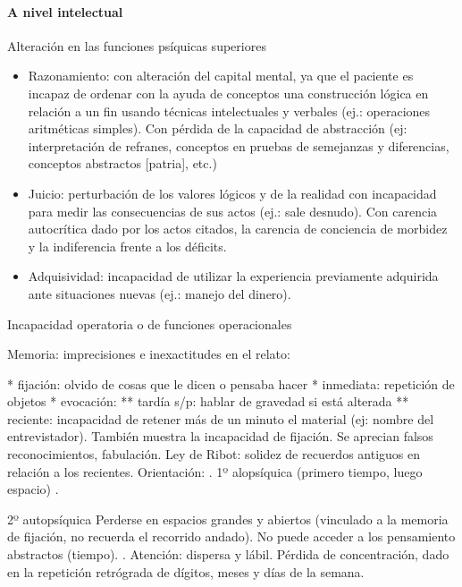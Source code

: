 \documentclass{scrbook}
\begin{document}
\paragraph{A nivel intelectual}
Alteración en las funciones psíquicas superiores
\begin{itemize}
	\item Razonamiento: con alteración del capital mental, ya que el paciente es incapaz de ordenar con la ayuda de conceptos una construcción lógica en relación a un fin usando técnicas intelectuales y verbales (ej.: operaciones aritméticas simples). Con pérdida de la capacidad de abstracción (ej: interpretación de refranes, conceptos en pruebas de semejanzas y diferencias, conceptos abstractos [patria], etc.)
	\item Juicio: perturbación de los valores lógicos y de la realidad con incapacidad para medir las consecuencias de sus actos (ej.: sale desnudo). Con carencia autocrítica dado por los actos citados, la carencia de conciencia de morbidez y la indiferencia frente a los déficits.
	\item Adquisividad: incapacidad de utilizar la experiencia previamente adquirida ante situaciones nuevas (ej.: manejo del dinero).
\end{itemize}
Incapacidad operatoria o de funciones operacionales

Memoria: imprecisiones e inexactitudes en el relato:

* fijación: olvido de cosas que le dicen o pensaba hacer
* inmediata: repetición de objetos
* evocación:
** tardía s/p: hablar de gravedad si está alterada
** reciente: incapacidad de retener más de un minuto el material (ej: nombre del entrevistador). También muestra la incapacidad de fijación. Se aprecian falsos reconocimientos, fabulación. Ley de Ribot: solidez de recuerdos antiguos en relación a los recientes. Orientación: . 1º alopsíquica (primero tiempo, luego espacio) .

2º autopsíquica Perderse en espacios grandes y abiertos (vinculado a la memoria de fijación, no recuerda el recorrido andado). No puede acceder a los pensamiento abstractos (tiempo). . Atención: dispersa y lábil. Pérdida de concentración, dado en la repetición retrógrada de dígitos, meses y días de la semana.
\end{document}

